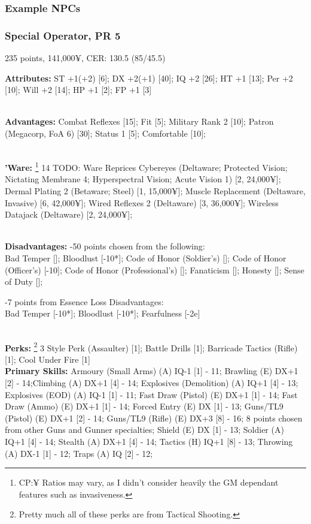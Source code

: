 \begin{multicols}{2}
	\subsubsection{Example NPCs}
	
	\subsubsection*{Special Operator, PR 5}
	\begin{flushright}
		235 points, 141,000¥, CER: 130.5 (85/45.5)
	\end{flushright}
	
	\textbf{Attributes: }
	ST +1(+2) [6]; DX +2(+1) [40]; IQ +2 [26]; HT +1 [13]; Per +2 [10]; Will +2 [14]; HP +1 [2]; FP +1 [3]
	
	\textbf{\\Advantages: }
	Combat Reflexes [15]; Fit [5]; Military Rank 2 [10]; Patron (Megacorp, FoA 6) [30]; Status 1 [5]; Comfortable [10];
	
	\textbf{\\'Ware: }\footnote{CP:¥ Ratios may vary, as I didn't consider heavily the GM dependant features such as invasiveness.} 14 TODO: Ware Reprices
	Cybereyes (Deltaware; Protected Vision; Nictating Membrane 4; Hyperspectral Vision; Acute Vision 1) [2, 24,000¥]; Dermal Plating 2 (Betaware; Steel) [1, 15,000¥]; Muscle Replacement (Deltaware, Invasive) [6, 42,000¥]; Wired Reflexes 2 (Deltaware) [3, 36,000¥]; Wireless Datajack (Deltaware) [2, 24,000¥];
	
	\textbf{\\Disadvantages: }
	-50 points chosen from the following:\\
	Bad Temper []; Bloodlust [-10*]; Code of Honor (Soldier's) []; Code of Honor (Officer's) [-10]; Code of Honor (Professional's) []; Fanaticism []; Honesty []; Sense of Duty [];
	
	-7 points from Essence Loss Disadvantages:\\
	Bad Temper [-10*]; Bloodlust [-10*]; Fearfulness [-2e]
	
	\textbf{\\Perks: }\footnote{Pretty much all of these perks are from Tactical Shooting.} 3 
	Style Perk (Assaulter) [1]; Battle Drills [1]; Barricade Tactics (Rifle) [1]; Cool Under Fire [1]\\
	
	\textbf{Primary Skills: }
	Armoury (Small Arms) (A) IQ-1 [1] - 11; Brawling (E) DX+1 [2] - 14;Climbing (A) DX+1 [4] - 14; Explosives (Demolition) (A) IQ+1 [4] - 13; Explosives (EOD) (A) IQ-1 [1] - 11; Fast Draw (Pistol) (E) DX+1 [1] - 14; Fast Draw (Ammo) (E) DX+1 [1] - 14; Forced Entry (E) DX [1] - 13; Guns/TL9 (Pistol) (E) DX+1 [2] - 14; Guns/TL9 (Rifle) (E) DX+3 [8] - 16; 8 points chosen from other Guns and Gunner specialties; Shield (E) DX [1] - 13; Soldier (A) IQ+1 [4] - 14; Stealth (A) DX+1 [4] - 14; Tactics (H) IQ+1 [8] - 13; Throwing (A) DX-1 [1] - 12; Traps (A) IQ [2] - 12; \\
	

\end{multicols}

